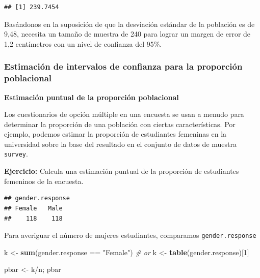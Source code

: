 \documentclass[]{article}
\newenvironment{Shaded}{\begin{snugshade}}{\end{snugshade}}
\newcommand{\KeywordTok}[1]{\textcolor[rgb]{0.13,0.29,0.53}{\textbf{{#1}}}}
\newcommand{\DecValTok}[1]{\textcolor[rgb]{0.00,0.00,0.81}{{#1}}}
\newcommand{\StringTok}[1]{\textcolor[rgb]{0.31,0.60,0.02}{{#1}}}
\newcommand{\CommentTok}[1]{\textcolor[rgb]{0.56,0.35,0.01}{\textit{{#1}}}}
\newcommand{\NormalTok}[1]{{#1}}
\numberwithin{equation}{section}
\begin{document}
\begin{verbatim}
## [1] 239.7454
\end{verbatim}

Basándonos en la suposición de que la desviación estándar de la
población es de 9,48, necesita un tamaño de muestra de 240 para lograr
un margen de error de 1,2 centímetros con un nivel de confianza del
95\%.

\subsubsection{Estimación de intervalos de confianza para la proporción
poblacional}\label{estimacion-de-intervalos-de-confianza-para-la-proporcion-poblacional}

\textbf{Estimación puntual de la proporción poblacional}

Los cuestionarios de opción múltiple en una encuesta se usan a menudo
para determinar la proporción de una población con ciertas
características. Por ejemplo, podemos estimar la proporción de
estudiantes femeninas en la universidad sobre la base del resultado en
el conjunto de datos de muestra \texttt{survey}.

\textbf{Ejercicio:} Calcula una estimación puntual de la proporción de
estudiantes femeninos de la encuesta.

\begin{Shaded}
\end{Shaded}

\begin{verbatim}
## gender.response
## Female   Male 
##    118    118
\end{verbatim}

Para averiguar el número de mujeres estudiantes, comparamos
\texttt{gender.response}

\begin{Shaded}
\begin{Highlighting}[]
\NormalTok{k <-}\StringTok{ }\KeywordTok{sum}\NormalTok{(gender.response ==}\StringTok{ "Female"}\NormalTok{) }
\CommentTok{# or }
\NormalTok{k <-}\StringTok{ }\KeywordTok{table}\NormalTok{(gender.response)[}\DecValTok{1}\NormalTok{]}

\NormalTok{pbar <-}\StringTok{ }\NormalTok{k/n; pbar}
\end{Highlighting}
\end{Shaded}
\end{document}
